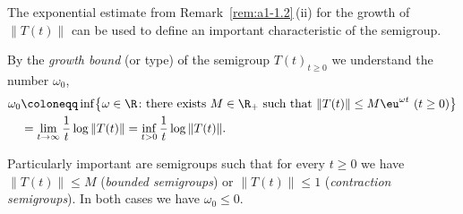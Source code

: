 The exponential estimate from Remark~\ref{rem:a1-1.2}\,(ii) for the growth of\/ $ \lVert T(t) \rVert $ can be used to define an important characteristic of the semigroup.
\begin{definition}\label{def:a1-1.3}
By the \emph{growth bound} (or type) of the semigroup $ T(t)_{t\geq0} $ we understand the number $ \omega_{0} $,
\begin{equation}\label{eq:a1-1.1}
\begin{aligned}
    \omega_{0} & \coloneqq \inf \bigl\{ \omega \in \R \colon \text{there exists } %
         M \in \R_{+} \text{ such that }
        \|T(t)\| \leq M \eu^{\omega t} \ (t \geq 0) \bigr\} \\
    & = \lim_{t\to\infty} \frac{1}{t}\log\|T(t)\|
      = \inf_{t>0} \frac{1}{t}\log\|T(t)\| .
\end{aligned}
\end{equation}
\end{definition}
Particularly important are semigroups such that for every $t \geq 0$ we have $\|T(t)\| \leq M$ (\emph{bounded semigroups}) or $\|T(t)\| \leq 1$ (\emph{contraction semigroups}).
In both cases we have $\omega_{0} \leq 0$.

